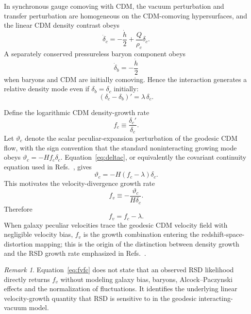 \documentclass[11pt]{article}
\theoremstyle{remark}
\newtheorem{remark}[theorem]{Remark}
\begin{document}
In synchronous gauge comoving with CDM, the vacuum perturbation and transfer perturbation are homogeneous on the CDM-comoving hypersurfaces, and the linear CDM density contrast obeys
\begin{equation}
    \dot\delta_c
    =-\frac{\dot h}{2}
    +\frac{Q}{\rho_c}\delta_c.
    \label{eq:deltac}
\end{equation}
A separately conserved pressureless baryon component obeys
\begin{equation}
    \dot\delta_b=-\frac{\dot h}{2}
    \label{eq:deltab}
\end{equation}
when baryons and CDM are initially comoving.  Hence the interaction generates a relative density mode even if $\delta_b=\delta_c$ initially:
\begin{equation}
    (\delta_c-\delta_b)'=\lambda\,\delta_c.
    \label{eq:biasgeneration}
\end{equation}

Define the logarithmic CDM density-growth rate
\begin{equation}
    f_c\equiv\frac{\delta_c'}{\delta_c}.
    \label{eq:fc}
\end{equation}
Let $\vartheta_c$ denote the scalar peculiar-expansion perturbation of the geodesic CDM flow, with the sign convention that the standard noninteracting growing mode obeys $\vartheta_c=-H f_c\delta_c$.  Equation~\eqref{eq:deltac}, or equivalently the covariant continuity equation used in Refs.~\cite{BorgesWands2020,Kaeonikhom2023}, gives
\begin{equation}
    \vartheta_c=-H\left(f_c-\lambda\right)\delta_c.
    \label{eq:vartheta}
\end{equation}
This motivates the velocity-divergence growth rate
\begin{equation}
    f_v\equiv-\frac{\vartheta_c}{H\delta_c}.
    \label{eq:fvdef}
\end{equation}
Therefore
\begin{equation}
    \boxed{f_v=f_c-\lambda.}
    \label{eq:fvfc}
\end{equation}
When galaxy peculiar velocities trace the geodesic CDM velocity field with negligible velocity bias, $f_v$ is the growth combination entering the redshift-space-distortion mapping; this is the origin of the distinction between density growth and the RSD growth rate emphasized in Refs.~\cite{BorgesWands2020,Kaeonikhom2023}.

\begin{remark}
Equation~\eqref{eq:fvfc} does not state that an observed RSD likelihood directly returns $f_v$ without modeling galaxy bias, baryons, Alcock--Paczynski effects and the normalization of fluctuations.  It identifies the underlying linear velocity-growth quantity that RSD is sensitive to in the geodesic interacting-vacuum model.
\end{remark}
\end{document}
